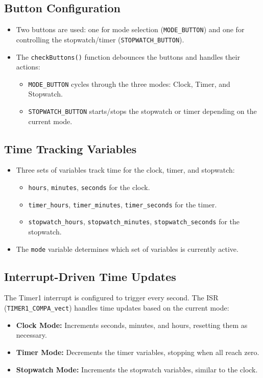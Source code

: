 \documentclass[journal]{IEEEtran}
\begin{document}
\subsection{Button Configuration}
\begin{itemize}
    \item Two buttons are used: one for mode selection (\texttt{MODE\_BUTTON}) and one for controlling the stopwatch/timer (\texttt{STOPWATCH\_BUTTON}).
    \item The \texttt{checkButtons()} function debounces the buttons and handles their actions:
    \begin{itemize}
        \item \texttt{MODE\_BUTTON} cycles through the three modes: Clock, Timer, and Stopwatch.
        \item \texttt{STOPWATCH\_BUTTON} starts/stops the stopwatch or timer depending on the current mode.
    \end{itemize}
\end{itemize}

\subsection{Time Tracking Variables}
\begin{itemize}
    \item Three sets of variables track time for the clock, timer, and stopwatch:
    \begin{itemize}
        \item \texttt{hours}, \texttt{minutes}, \texttt{seconds} for the clock.
        \item \texttt{timer\_hours}, \texttt{timer\_minutes}, \texttt{timer\_seconds} for the timer.
        \item \texttt{stopwatch\_hours}, \texttt{stopwatch\_minutes}, \texttt{stopwatch\_seconds} for the stopwatch.
    \end{itemize}
    \item The \texttt{mode} variable determines which set of variables is currently active.
\end{itemize}

\subsection{Interrupt-Driven Time Updates}
The Timer1 interrupt is configured to trigger every second. The ISR (\texttt{TIMER1\_COMPA\_vect}) handles time updates based on the current mode:
\begin{itemize}
    \item \textbf{Clock Mode:} Increments seconds, minutes, and hours, resetting them as necessary.
    \item \textbf{Timer Mode:} Decrements the timer variables, stopping when all reach zero.
    \item \textbf{Stopwatch Mode:} Increments the stopwatch variables, similar to the clock.
\end{itemize}
\end{document}
